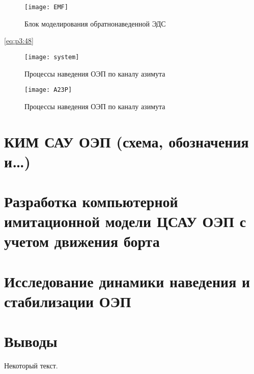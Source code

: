 \begin{figure}[ht]
	\centering
	\texttt{[image: EMF]} 
	\caption{Блок моделирования обратнонаведенной ЭДС}
	\label{fig:EMF}
\end{figure}






\ref{eq:p3:48}

\begingroup
\captiondelim{ } %

\endgroup
 
 
\begin{figure}[ht]
 	\centering
 	\texttt{[image: system]} 
 	\caption{Процессы наведения ОЭП по каналу азимута}
 	\label{fig:az_true}
\end{figure}



\begin{figure}[ht]
	\centering
	\texttt{[image: A23P]} 
	\caption{Процессы наведения ОЭП по каналу азимута}
	\label{fig:az_true}
\end{figure}


















\section{КИМ САУ ОЭП (схема, обозначения и…) } \label{ch:ch5/sect2}

\section{Разработка компьютерной имитационной модели ЦСАУ ОЭП с учетом  движения борта} \label{ch:ch5/sect3}

\section{Исследование динамики наведения и стабилизации ОЭП} \label{ch:ch5/sect4}

\section{Выводы} \label{ch:ch5/sect5}
	


Некоторый текст.

\clearpage